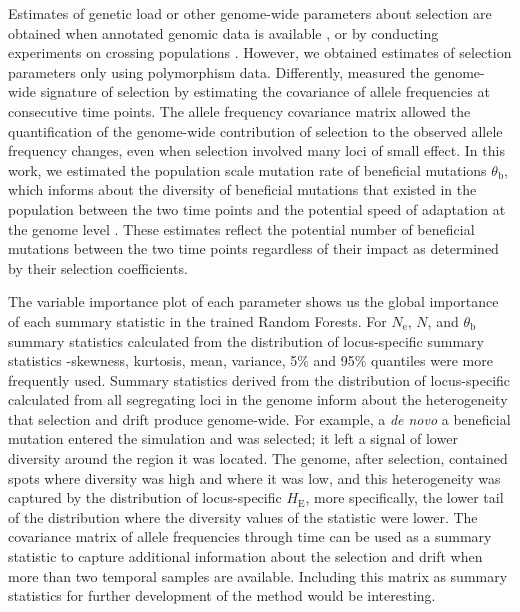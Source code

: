 \documentclass[a4paper, 12pt]{article}
\begin{document}
Estimates of genetic load or other genome-wide parameters about selection are obtained when annotated genomic data is available \citep{Henn:2015ce}, or by conducting experiments on crossing populations \citep[for the genetic load;][]{Plough:2016gw}. However, we obtained estimates of selection parameters only using polymorphism data. Differently, \citet{Buffalo:2020hq} measured the genome-wide signature of selection by estimating the covariance of allele frequencies at consecutive time points. The allele frequency covariance matrix allowed the quantification of the genome-wide contribution of selection to the observed allele frequency changes, even when selection involved many loci of small effect. In this work, we estimated the population scale mutation rate of beneficial mutations $\theta_{\mathrm{b}}$, which informs about the diversity of beneficial mutations that existed in the population between the two time points and the potential speed of adaptation at the genome level \citep{Hermisson:2017hw}. These estimates reflect the potential number of beneficial mutations between the two time points regardless of their impact as determined by their selection coefficients.

The variable importance plot of each parameter shows us the global importance of each summary statistic in the trained Random Forests. For $N_{\mathrm{e}}$, $N$, and $\theta_{\mathrm{b}}$ summary statistics calculated from the distribution of locus-specific summary statistics -skewness, kurtosis, mean, variance, 5\% and 95\% quantiles were more frequently used. Summary statistics derived from the distribution of locus-specific calculated from all segregating loci in the genome inform about the heterogeneity that selection and drift produce genome-wide. For example, a \textit{de novo} a beneficial mutation entered the simulation and was selected; it left a signal of lower diversity around the region it was located. The genome, after selection, contained spots where diversity was high and where it was low, and this heterogeneity was captured by the distribution of locus-specific $H_{\mathrm{E}}$, more specifically, the lower tail of the distribution where the diversity values of the statistic were lower. The covariance matrix of allele frequencies through time \citep{Buffalo:2020hq} can be used as a summary statistic to capture additional information about the selection and drift when more than two temporal samples are available. Including this matrix as summary statistics for further development of the method would be interesting.
\end{document}
